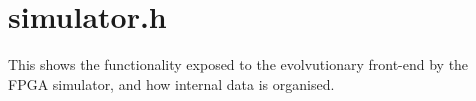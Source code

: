\documentclass[ %
                    author={Alexander Dalton},
                supervisor={Prof. Seth Bullock},
                    degree={MEng},
                     title={Exploring Evolutionary Hardware and its Application to Dynamic Problems},
                  subtitle={},
                      type={research},
                      year={2018} ]{dissertation}
\begin{document}
\backmatter





\appendix

\chapter{simulator.h}
This shows the functionality exposed to the evolvutionary front-end by the
FPGA simulator, and how internal data is organised.
\end{document}

